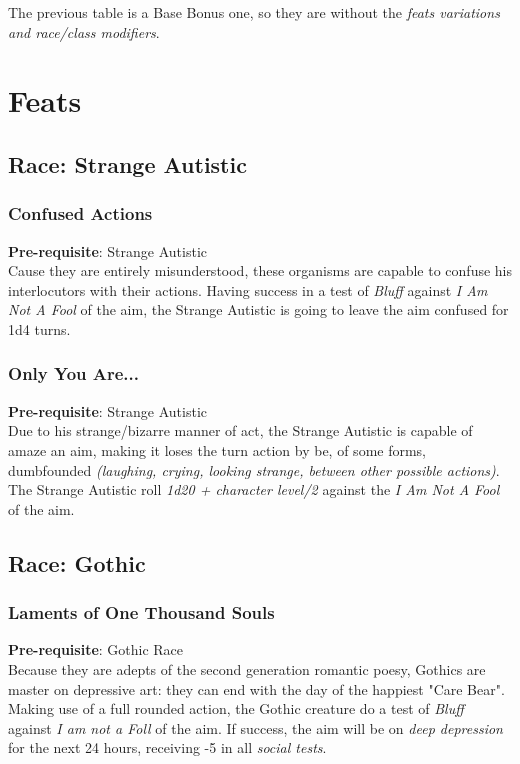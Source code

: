 \documentclass[ letterpaper,12pt]{article}
\begin{document}
The previous table is a Base Bonus one, so they are without the {\it feats variations and race/class modifiers}.\\

\section{Feats}

\subsection{Race: Strange Autistic}

\subsubsection{Confused Actions}
{\bf Pre-requisite}: Strange Autistic\\
Cause they are entirely misunderstood, these organisms are capable to confuse his interlocutors with their actions. Having success in a test of {\it Bluff} against {\it I Am Not A Fool} of the aim, the Strange Autistic is going to leave the aim confused for 1d4 turns.

\subsubsection{Only You Are...}
 {\bf Pre-requisite}: Strange Autistic\\
Due to his strange/bizarre manner of act, the Strange Autistic is capable of amaze an aim, making it loses the turn action by be, of some forms, dumbfounded {\it (laughing, crying, looking strange, between other possible actions)}.  The Strange Autistic roll {\it 1d20 + character level/2} against the {\it I Am Not A Fool} of the aim.

\subsection{Race: Gothic}

\subsubsection{Laments of One Thousand Souls}
{\bf Pre-requisite}: Gothic Race\\
Because they are adepts of the second generation romantic poesy, Gothics are master on depressive art: they can end with the day of the happiest "Care Bear". Making use of a full rounded action, the Gothic creature do a test of {\it Bluff} against {\it I am not a Foll} of the aim. If success, the aim will be on {\it deep depression} for the next 24 hours, receiving -5 in all {\it social tests}.
\end{document}
